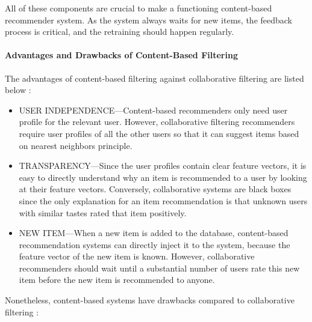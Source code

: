 All of these components are crucial to make a functioning content-based recommender system. As the system always waits for new items, the feedback process is critical, and the retraining should happen regularly.


\paragraph{Advantages and Drawbacks of Content-Based Filtering}

The advantages of content-based filtering against collaborative filtering are listed below \cite{de2015semantics}:

\begin{itemize}
	\item USER INDEPENDENCE—Content-based recommenders only need user profile for the relevant user. However, collaborative filtering recommenders require user profiles of all the other users so that it can suggest items based on nearest neighbors principle.
	\item TRANSPARENCY—Since the user profiles contain clear feature vectors, it is easy to directly understand why an item is recommended to a user by looking at their feature vectors. Conversely, collaborative systems are black boxes since the only explanation for an item recommendation is that unknown users with similar tastes rated that item positively.
	\item NEW ITEM—When a new item is added to the database, content-based recommendation systems can directly inject it to the system, because the feature vector of the new item is known. However, collaborative recommenders should wait until a substantial number of users rate this new item before the new item is recommended to anyone.
\end{itemize}

Nonetheless, content-based systems have drawbacks compared to collaborative filtering  \cite{de2015semantics}: 


